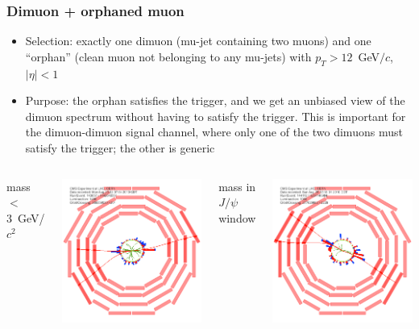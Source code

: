 \documentclass[compress]{beamer}
\begin{document}
\begin{frame}
\frametitle{Dimuon + orphaned muon}
\begin{itemize}
\item Selection: exactly one dimuon (mu-jet containing two muons) and one ``orphan'' (clean muon not belonging to any mu-jets) with $p_T > 12$~GeV$/c$, $|\eta| < 1$
\item Purpose: the orphan satisfies the trigger, and we get an unbiased view of the dimuon spectrum without having to satisfy the trigger.  This is important for the dimuon-dimuon signal channel, where only one of the two dimuons must satisfy the trigger; the other is generic
\end{itemize}

\begin{columns}
\centering mass $<$ 3~GeV/$c^2$

\includegraphics[width=0.8\linewidth]{dimuorphan_eventdisplay_balanced.png}

\centering mass in $J/\psi$ window

\includegraphics[width=0.8\linewidth]{dimuorphan_eventdisplay_jpsi.png}
\end{columns}
\end{frame}
\end{document}
